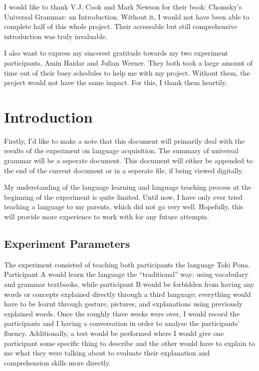 \documentclass[a4paper,10pt]{article}
\begin{document}
I would like to thank V.J. Cook and Mark Newson for their book: Chomsky's
Universal Grammar: an Introduction. Without it, I would not have been able to complete half of this
whole project. Their accessable but still comprehensive introduction was truly invaluable.

I also want to express my sincerest gratitude towards my two experiment participants, Amin Haidar
and Julian Werner. They both took a large amount of time out of their busy schedules to help me with
my project. Without them, the project would not have the same impact. For this, I thank them heartily.


\section{Introduction}
Firstly, I'd like to make a note that this document will primarily deal with the results of the
experiment on language acquisition. The summary of universal grammar will be a seperate document.
This document will either be appended to the end of the current document or in a seperate file, if
being viewed digitally.

My understanding of the language learning and language teaching process at the beginning of the
experiment is quite limited. Until now, I have only ever tried teaching a language to my
parents, which did not go very well. Hopefully, this will provide more experience to work with
for any future attempts.

\subsection{Experiment Parameters}
The experiment consisted of teaching both participants the language Toki Pona. Participant A would
learn the language the ``traditional'' way: using vocabulary and grammar textbooks, while participant
B would be forbidden from having any words or concepts explained directly through a third language;
everything would have to be learnt through gesture, pictures, and explanations using previously
explained words. Once the roughly three weeks were over, I would record the participants and I having
a conversation in order to analyse the participants' fluency. Additionally, a test would be performed
where I would give one participant some specific thing to describe and the other would have to explain
to me what they were talking about to evaluate their explanation and comprehension skills more directly.
\end{document}
